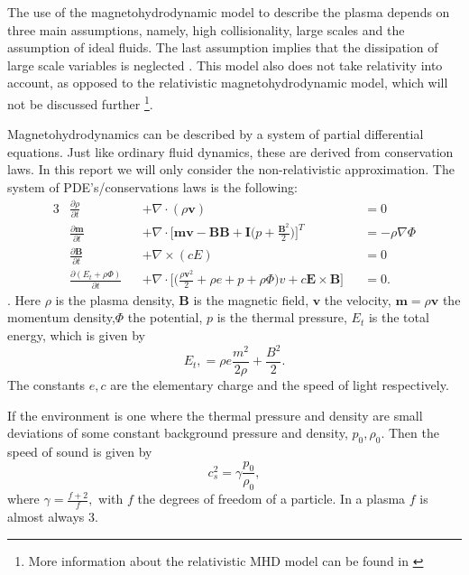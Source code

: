 \documentclass{article}
\begin{document}
The use of the magnetohydrodynamic model to describe the plasma depends on three main assumptions, namely, high collisionality, large scales and the assumption of ideal fluids. The last assumption implies that the dissipation of large scale variables is neglected \cite{goedbloed2004principles}. This model also does not take relativity into account, as opposed to the relativistic magnetohydrodynamic model, which will not be discussed further \footnote{More information about the relativistic MHD model can be found in \cite{karas2005introduction}}.

Magnetohydrodynamics can be described by a system of partial differential equations. 
Just like ordinary fluid dynamics, these are derived from conservation laws. 
In this report we will only consider the non-relativistic approximation.  
The system of PDE's/conservations laws is the following:
\begin{alignat}{3}
    &\frac{\partial \rho}{\partial t} &&+ \nabla \cdot (\rho \mathbf v) &&= 0 \tag{mass}\label{masscont}\\
    &\frac{\partial \mathbf m}{\partial t} &&+  \nabla \cdot \bigg[\mathbf{mv - BB+ I}\bigg(p + \frac{\mathbf B^2}{2}\bigg)\bigg]^T &&= -\rho \nabla \Phi \tag{moment}\label{cauchymoment}\\
    &\frac{\partial \mathbf B}{\partial t} &&+ \nabla \times (cE) &&= 0 \tag{charge}\label{Faraday}\\
    &\frac{\partial(E_t + \rho \Phi)}{\partial t} &&+ \nabla \cdot \bigg[\bigg(\frac{\rho \mathbf v^2}{2} + \rho e + p + \rho \Phi\bigg)v + c \mathbf E \times \mathbf B\bigg] &&= 0 \tag{energy}\label{energy}.
\end{alignat} .
Here $\rho$ is the plasma density, $\mathbf B$ is the magnetic field,  $\mathbf v$ the velocity, $\mathbf m= \rho \mathbf v$ the momentum density,$\Phi$ the potential, $p$ is the thermal pressure, $E_t$ is the total energy, which is given by \[
E_t, = \rho e \frac{m^2}{2\rho} + \frac{B^2}{2}
.\]  
The constants  $e, c$ are the elementary charge and the speed of light respectively.

If the environment is one where the thermal pressure and density are small deviations of some constant background pressure and density, $p_0, \rho_0$. Then the speed of sound is given by \[
c_s^2 = \gamma \frac{p_0}{\rho_0}
,\]
where $\gamma = \frac{f + 2}{f}, $ with $f$ the degrees of freedom of a particle. In a plasma $f$ is almost always $3$. 
\end{document}
